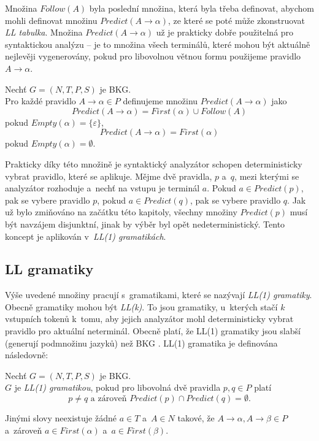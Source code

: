 Množina $Follow(A)$ byla poslední množina, která byla třeba definovat, abychom mohli definovat množinu $Predict(A \rightarrow \alpha)$, ze které se poté může zkonstruovat \emph{LL tabulka}.
Množina $Predict(A \rightarrow \alpha)$ už je prakticky dobře použitelná pro syntaktickou analýzu -- je to množina všech terminálů, které mohou být aktuálně nejlevěji vygenerovány, pokud pro libovolnou větnou formu použijeme pravidlo $A \rightarrow \alpha$.
\begin{definition}
    Nechť $G = (N, T, P, S)$ je BKG.\\
    Pro každé pravidlo $A \rightarrow \alpha \in P$ definujeme množinu $Predict(A \rightarrow \alpha)$ jako
    \begin{equation*}
        Predict(A \rightarrow \alpha) = First(\alpha) \cup Follow(A)
    \end{equation*}
    pokud $Empty(\alpha) = \{\varepsilon\}$,
    \begin{equation*}
        Predict(A \rightarrow \alpha) = First(\alpha)
    \end{equation*}
    pokud $Empty(\alpha) = \emptyset$.
\end{definition}
Prakticky díky této množině je syntaktický analyzátor schopen deterministicky vybrat pravidlo, které se aplikuje.
Mějme dvě pravidla, $p$ a~$q$, mezi kterými se analyzátor rozhoduje a~nechť na vstupu je terminál $a$.
Pokud $a \in Predict(p)$, pak se vybere pravidlo $p$, pokud $a \in Predict(q)$, pak se vybere pravidlo $q$.
Jak už bylo zmiňováno na začátku této kapitoly, všechny množiny $Predict(p)$ musí být navzájem disjunktní, jinak by výběr byl opět nedeterministický.
Tento koncept je aplikován v~\emph{LL(1) gramatikách}.

\subsection*{LL gramatiky}

Výše uvedené množiny pracují s~gramatikami, které se nazývají \emph{LL(1) gramatiky}.
Obecně gramatiky mohou být \emph{LL(k)}.
To jsou gramatiky, u~kterých stačí $k$ vstupních tokenů k~tomu, aby jejich analyzátor mohl deterministicky vybrat pravidlo pro aktuální neterminál.
Obecně platí, že LL(1) gramatiky jsou slabší (generují podmnožinu jazyků) než BKG \cite{medunaElementsOfCompDesign}.
LL(1) gramatika je definována následovně:
\begin{definition}
    Nechť $G = (N, T, P, S)$ je BKG.\\
    $G$ je \emph{LL(1) gramatikou}, pokud pro libovolná dvě pravidla $p, q \in P$ platí
    \begin{equation*}
        p \neq q \text{ a zároveň } Predict(p) \cap Predict(q) = \emptyset.
    \end{equation*}
\end{definition}
Jinými slovy neexistuje žádné $a \in T$ a~$A \in N$ takové, že $A \rightarrow \alpha, A \rightarrow \beta \in P$ a~zároveň $a \in First(\alpha)$ a~$a \in First(\beta)$.

